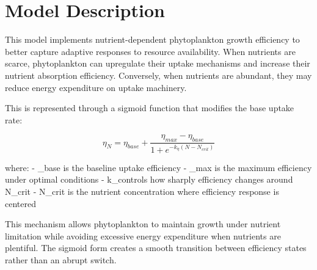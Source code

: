 \section{Model Description}

This model implements nutrient-dependent phytoplankton growth efficiency to better capture adaptive responses to resource availability. When nutrients are scarce, phytoplankton can upregulate their uptake mechanisms and increase their nutrient absorption efficiency. Conversely, when nutrients are abundant, they may reduce energy expenditure on uptake machinery.

This is represented through a sigmoid function that modifies the base uptake rate:

\[ \eta_N = \eta_{base} + \frac{\eta_{max} - \eta_{base}}{1 + e^{-k_\eta(N - N_{crit})}} \]

where:
- \eta_{base} is the baseline uptake efficiency
- \eta_{max} is the maximum efficiency under optimal conditions  
- k_\eta controls how sharply efficiency changes around N_{crit}
- N_{crit} is the nutrient concentration where efficiency response is centered

This mechanism allows phytoplankton to maintain growth under nutrient limitation while avoiding excessive energy expenditure when nutrients are plentiful. The sigmoid form creates a smooth transition between efficiency states rather than an abrupt switch.
